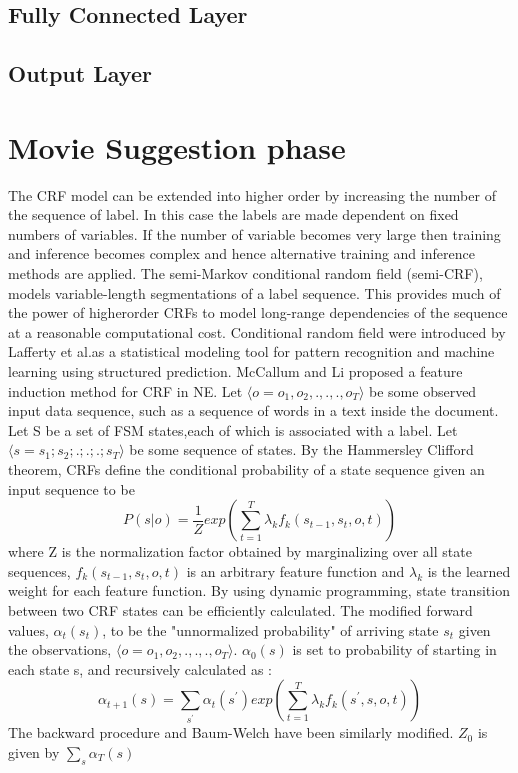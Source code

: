 \documentclass[12pt,a4paper,final]{extreport}
\begin{document}
\subsection{Fully Connected Layer}
 \vspace{0.5cm}
\subsection{Output Layer}

\section{Movie Suggestion phase }

The CRF model can be extended into
higher order by increasing the number of the sequence of label.
In this case the labels are made dependent on fixed numbers of
variables. If the number of variable becomes very large then
training and inference becomes complex and hence alternative
training and inference methods are applied.
The semi-Markov conditional random
field (semi-CRF), models variable-length segmentations of a
label sequence. This provides much of the power of higherorder
CRFs to model long-range dependencies of the sequence
at a reasonable computational cost.
 Conditional random field were introduced by Lafferty et al.as a statistical modeling tool for pattern recognition and machine learning using structured prediction. McCallum and Li proposed
 a feature induction method for CRF in NE. Let  $ \langle o=o_{1},o_{2},.,.,.,o_{T}\rangle$  be some observed input data sequence, such as a sequence of words in a text inside the document. Let S be a set of FSM states,each of which is associated with a label. Let $\langle s=s_{1}; s_{2};.;.;.;s_{T}\rangle$ be some sequence of states. By the Hammersley Clifford theorem, CRFs define the conditional probability of a state sequence given an input sequence to be
 \begin{equation*}
  P(s|o) =\frac{1}{Z}exp\left(\sum_{t=1}^{T}\lambda_{k}f_{k}(s_{t-1},s_{t},o,t)\right)
 \end{equation*}
 \hspace{0.5cm} where Z is the normalization factor obtained by marginalizing over all state sequences, $f_{k}(s_{t-1},s_{t},o,t)$ is an arbitrary feature function and $\lambda_{k}$ is the learned weight for each feature function. By using dynamic programming, state transition between two CRF states can be efficiently calculated. The modified
 forward values, $\alpha_{t}(s_{t})$, to be the "unnormalized probability" of arriving state $s_t$ given the observations, $ \langle o=o_{1},o_{2},.,.,.,o_{T}\rangle$. $\alpha_{0}(s)$ is set to probability of starting in each state s, and recursively calculated as :
  \begin{equation*}
 \alpha_{t+1}(s) =\sum_{s^{'}}\alpha_{t}(s^{'})exp\left(\sum_{t=1}^{T}\lambda_{k}f_{k}(s^{'},s,o,t)\right)
 \end{equation*}
 \hspace{0.5cm} The backward procedure and Baum-Welch have been similarly modified. $Z_{0}$ is given by $\sum_{s}\alpha_{T}(s)$
\end{document}
